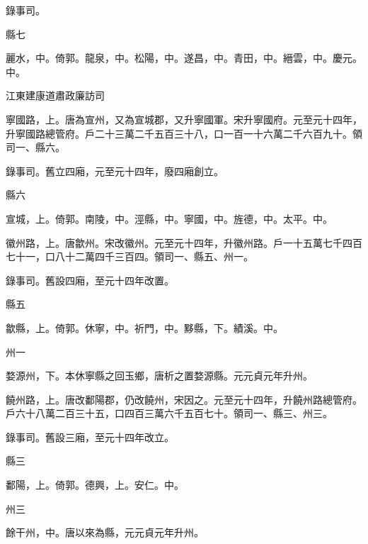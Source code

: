 \begin{pinyinscope}
 錄事司。



 縣七



 麗水，中。倚郭。龍泉，中。松陽，中。遂昌，中。青田，中。縉雲，中。慶元。中。



 江東建康道肅政廉訪司



 寧國路，上。唐為宣州，又為宣城郡，又升寧國軍。宋升寧國府。元至元十四年，升寧國路總管府。戶二十三萬二千五百三十八，口一百一十六萬二千六百九十。領司一、縣六。



 錄事司。舊立四廂，元至元十四年，廢四廂創立。



 縣六



 宣城，上。倚郭。南陵，中。涇縣，中。寧國，中。旌德，中。太平。中。



 徽州路，上。唐歙州。宋改徽州。元至元十四年，升徽州路。戶一十五萬七千四百七十一，口八十二萬四千三百四。領司一、縣五、州一。



 錄事司。舊設四廂，至元十四年改置。



 縣五



 歙縣，上。倚郭。休寧，中。祈門，中。黟縣，下。績溪。中。



 州一



 婺源州，下。本休寧縣之回玉鄉，唐析之置婺源縣。元元貞元年升州。



 饒州路，上。唐改鄱陽郡，仍改饒州，宋因之。元至元十四年，升饒州路總管府。戶六十八萬二百三十五，口四百三萬六千五百七十。領司一、縣三、州三。



 錄事司。舊設三廂，至元十四年改立。



 縣三



 鄱陽，上。倚郭。德興，上。安仁。中。



 州三



 餘干州，中。唐以來為縣，元元貞元年升州。




\end{pinyinscope}
